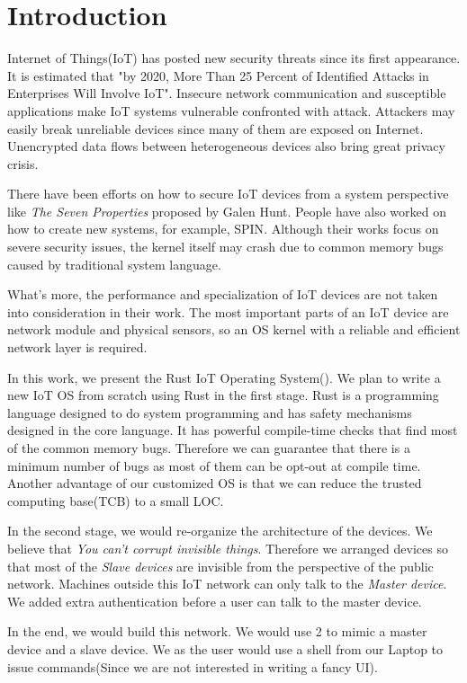 \section{Introduction}

Internet of Things(IoT) has posted new security threats since its first appearance. It is estimated that "by 2020, More Than 25 Percent of Identified Attacks in Enterprises Will Involve IoT"\cite{gartner2016gartner}. Insecure network communication and susceptible applications make IoT systems vulnerable confronted with attack. Attackers may easily break unreliable devices since many of them are exposed on Internet\cite{kolias2017ddos}. Unencrypted data flows between heterogeneous devices also bring great privacy crisis\cite{khan2018iot}.


There have been efforts on how to secure IoT devices from a system perspective like \textit{The Seven Properties}\cite{hunt2017the} proposed by Galen Hunt. People have also worked on how to create new systems, for example, SPIN\cite{hesselman2017spin}. 
Although their works focus on severe security issues, the kernel itself may crash due to common memory bugs caused by traditional system language.

What's more, the performance and specialization of IoT devices are not taken into consideration in their work. 
The most important parts of an IoT device are network module and physical sensors, so an OS kernel with a reliable and efficient network layer is required.



In this work, we present the Rust IoT Operating System(\ritos).
We plan to write a new IoT OS from scratch using Rust in the first stage.
Rust is a programming language designed to do system programming and has safety mechanisms designed in the core language.
It has powerful compile-time checks that find most of the common memory bugs.
Therefore we can guarantee that there is a minimum number of bugs as most of them can be opt-out at compile time. 
Another advantage of our customized OS is that we can reduce the trusted computing base(TCB) to a small LOC.

In the second stage, we would re-organize the architecture of the devices.
We believe that \textit{You can't corrupt invisible things}.
Therefore we arranged devices so that most of the \textit{Slave devices} are invisible from the perspective of the public network.
Machines outside this IoT network can only talk to the \textit{Master device}.
We added extra authentication before a user can talk to the master device.


In the end, we would build this network. 
We would use 2 \rpi to mimic a master device and a slave device. 
We as the user would use a shell from our Laptop to issue commands(Since we are not interested in writing a fancy UI).